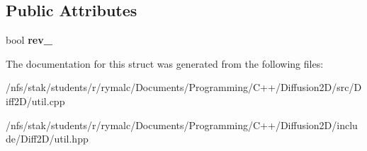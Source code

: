 \subsection*{Public Attributes}
\begin{DoxyCompactItemize}
\item 
\hypertarget{structEdgeError_a704a81b20878f5b534df310ea179ae02}{bool {\bfseries rev\+\_\+}}\label{structEdgeError_a704a81b20878f5b534df310ea179ae02}

\end{DoxyCompactItemize}


The documentation for this struct was generated from the following files\+:\begin{DoxyCompactItemize}
\item 
/nfs/stak/students/r/rymalc/\+Documents/\+Programming/\+C++/\+Diffusion2\+D/src/\+Diff2\+D/util.\+cpp\item 
/nfs/stak/students/r/rymalc/\+Documents/\+Programming/\+C++/\+Diffusion2\+D/include/\+Diff2\+D/util.\+hpp\end{DoxyCompactItemize}
